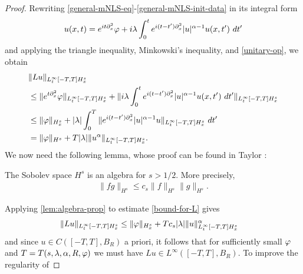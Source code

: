 \begin{proof}
Rewriting \eqref{general-mNLS-eq}-\eqref{general-mNLS-init-data} in its 
integral form
%
%
\begin{equation}
  \label{mNLS-int-form-with-op}
  \begin{split}
    u(x,t) = e^{it \partial_x^2} \varphi + i \lambda \int_0^t e^{i(t - 
    t')\partial_x^2} |u|^{\alpha -1} u(x, t') \ dt' 
  \end{split}
\end{equation}
%
%
and applying the triangle inequality, Minkowski's inequality, and 
\eqref{unitary-op}, we obtain
%
%
\begin{equation}
  \label{bound-for-L}
  \begin{split}
    & \|Lu\|_{L^\infty_t[-T, T] H^s_x}
    \\
    & \le \|e^{t \p_x^2}
    \vp\|_{L^\infty_t[-T, T] H^s_x} + \|i \lambda \int_0^t e^{i(t - 
    t')\p_x^2} |u|^{\alpha -1} u(x, t') \ dt' \|_{L^\infty_t[-T, T] 
    H^s_x} 
    \\
    & \le \|\vp\|_{H^s_x} + |\lambda| \int_0^T \|e^{i(t 
    -t')\p_x^2} |u|^{\alpha -1} u \|_{L^\infty_t[-T, T] H^s_x} \ 
    dt'
    \\
    & = \|\vp\|_{H^s} + T |\lambda| \|u^\alpha \|_{L^\infty_t[-T, T] H^s_x}.
  \end{split}
\end{equation}
%
%
We now need the following lemma, whose proof can be found in Taylor 
\cite{Taylor_1991_Pseudodifferent}:
%
%
%
\begin{lemma}
  \label{lem:algebra-prop}
  The Sobolev space $H^s$ is an algebra for $s>1/2$. More precisely, 
%
%
\begin{equation}
  \label{algebra-prop}
  \begin{split}
    \|fg\|_{H^s} \le c_s \|f\|_{H^s} \|g\|_{H^s}.
  \end{split}
\end{equation}
%
%
%
\end{lemma}
%
%
Applying \cref{lem:algebra-prop} to estimate \eqref{bound-for-L} gives
%
%
%
%
\begin{equation}
  \label{Tu-space-bound}
  \begin{split}
    \|Lu\|_{L^\infty_t[-T, T] H^s_x}
    & \le \|\varphi\|_{H^s_x} + Tc_s | \lambda| \|u\|_{L^\infty_t[-T, T] 
    H^s_x}^\alpha
  \end{split}
\end{equation}
%
%
and since $u \in C([-T, T], B_R)$ a priori, it follows
that for sufficiently small $\varphi$ and $T = T(s, \lambda, \alpha, R, \varphi)$ we must 
have $Lu \in L^\infty([-T, T], B_R)$. To improve the regularity of 

\end{proof}
